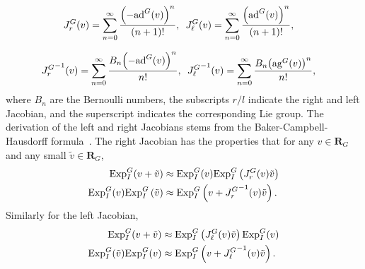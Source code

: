 \begin{align*}
J_r^G(v) & =\sum_{n=0}^{\infty}\frac{\left(-\text{ad}^{G}(v)\right)^{n}}{\left(n+1\right)!}, \hspace{0.5em}  J_\ell^{G}(v)=\sum_{n=0}^{\infty}\frac{\left(\text{ad}^G(v)\right)^{n}}{\left(n+1\right)!},
\end{align*}

\begin{align*}
{J_r^{G}}^{-1}(v) & =\sum_{n=0}^{\infty}\frac{B_{n}\mathopen{}\left(-\text{ad}^G(v)\right)^{n}\mathclose{}}{n!},  \hspace{0.5em} {J_\ell^{G}}^{-1}(v)=\sum_{n=0}^{\infty}\frac{B_{n}\mathopen{}\left(\text{ag}^G(v)\right)^{n}\mathclose{}}{n!},
\end{align*}
where $B_{n}$ are the Bernoulli numbers, the subscripts $r/l$ indicate the right and left Jacobian, and the superscript indicates the corresponding Lie group. The derivation of the left
and right Jacobians stems from the Baker-Campbell-Hausdorff formula~\cite{Hall2003,Barfoot2019}. The
right Jacobian has the properties that for any $v\in\mathbf{R}_G$ and any small $\tilde{v}\in\mathbf{R}_G$, 
\begin{subequations}\label{eq:Jr_property}
\begin{align}
\text{Exp}_I^{G}(v + \tilde{v}) & \approx\text{Exp}_I^{G}(v)\text{Exp}_I^{G}\left(J_r^G(v)\tilde{v}\right)\\
\text{Exp}_I^{G}(v)\text{Exp}_I^{G}\left(\tilde{v}\right) & \approx\text{Exp}_I^{G}\left(v+{J_r^{G}}^{-1}(v)\tilde{v}\right).
\end{align}
\end{subequations}
%
Similarly for the left Jacobian,
\begin{align*}
\text{Exp}_I^{G}(v+\tilde{v}) & \approx\text{Exp}_I^{G}\left(J_\ell^{G}(v)\tilde{v}\right)\text{Exp}_I^{G}(v)\\
\text{Exp}_I^{G}(\tilde{v})\text{Exp}_I^{G}(v) & \approx\text{Exp}_I^{G}\left(v+{J_\ell^G}^{-1}(v)\tilde{v}\right).
\end{align*}


